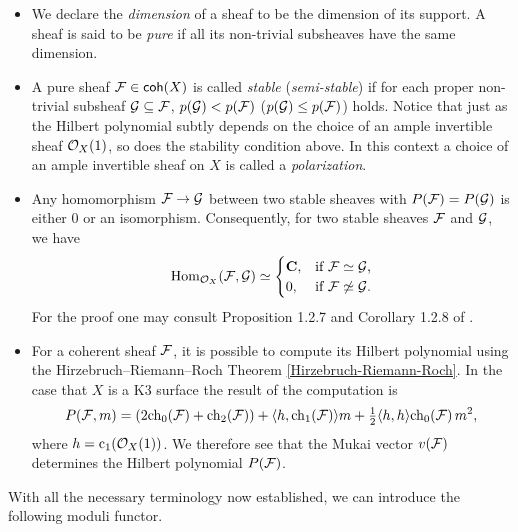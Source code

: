 \begin{itemize}[label = $\vartriangleright$]
    \item{
        We declare the \emph{dimension} of a sheaf to be the dimension of its support.
        A sheaf is said to be \emph{pure} if all its non-trivial subsheaves have the same dimension. 
    }
    \item{
        A pure sheaf $\mathcal F \in \mathsf{coh}(X)$ is called \emph{stable} (\resp \emph{semi-stable}) if for each proper non-trivial subsheaf $\mathcal G \subseteq \mathcal F$, $p(\mathcal G) < p(\mathcal F)$ (\resp $p(\mathcal G) \leq p(\mathcal F)$) holds. Notice that just as the Hilbert polynomial subtly depends on the choice 
        of an ample invertible sheaf ${\mathcal{O}_{X}}(1)$, so does the stability condition above. In this context a choice of an ample invertible sheaf on $X$ is called a \emph{polarization}.
    }
    \item{
        Any homomorphism $\mathcal F \to \mathcal G$ between two stable sheaves with $P(\mathcal F) = P(\mathcal G)$ is either $0$ or an isomorphism. Consequently, for two stable sheaves $\mathcal F$ and $\mathcal G$, we have
        \begin{equation}
            \label{eq: schur lemma for stable sheaves}
            \operatorname{Hom}_{{\mathcal{O}_{X}}}(\mathcal F, \mathcal G) \simeq \begin{cases}
                \mathbf C, &\text{if $\mathcal F \simeq \mathcal G$,} \\
                0, &\text{if $\mathcal F \not\simeq \mathcal G$.}
            \end{cases}
        \end{equation}
        For the proof one may consult Proposition 1.2.7 and Corollary 1.2.8 of \cite[\S I.1.2]{HuybrechtsLehn2010}.
    }
    \item{
        For a coherent sheaf $\mathcal F$, it is possible to compute its Hilbert polynomial using the Hirzebruch--Riemann--Roch Theorem \ref{Hirzebruch-Riemann-Roch}. In the case that $X$ is a K3 surface the result of the computation is
        \[
            P(\F, m) = (2\ch[0](\F) + \ch[2](\F)) + \pairing{h}{\ch[1](\F)}m + \tfrac{1}{2}\pairing{h}{h}\ch[0]{\F}m^2,
        \]
        where $h = \cclass[1](\struct{X}(1))$. We therefore see that the Mukai vector $v(\mathcal F)$ determines the Hilbert polynomial $P(\mathcal F)$. 
    }
\end{itemize}

\noindent
With all the necessary terminology now established, we can introduce the following moduli functor. 

